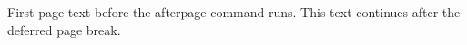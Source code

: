 \documentclass{article}
\begin{document}
First page text before the afterpage command runs.
\afterpage{\clearpage}
This text continues after the deferred page break.
\end{document}
